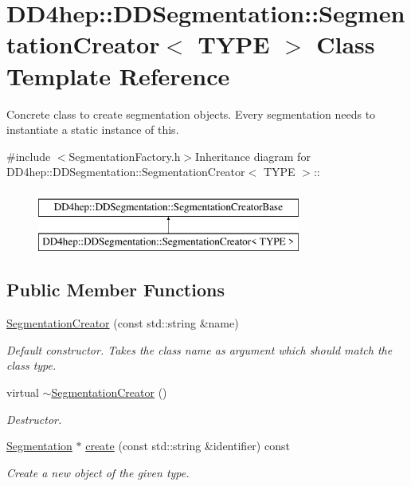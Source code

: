 \hypertarget{class_d_d4hep_1_1_d_d_segmentation_1_1_segmentation_creator}{
\section{DD4hep::DDSegmentation::SegmentationCreator$<$ TYPE $>$ Class Template Reference}
\label{class_d_d4hep_1_1_d_d_segmentation_1_1_segmentation_creator}
}


Concrete class to create segmentation objects. Every segmentation needs to instantiate a static instance of this.  


{\ttfamily \#include $<$SegmentationFactory.h$>$}Inheritance diagram for DD4hep::DDSegmentation::SegmentationCreator$<$ TYPE $>$::\begin{figure}[H]
\begin{center}
\leavevmode
\includegraphics[height=2cm]{class_d_d4hep_1_1_d_d_segmentation_1_1_segmentation_creator}
\end{center}
\end{figure}
\subsection*{Public Member Functions}
\begin{DoxyCompactItemize}
\item 
\hyperlink{class_d_d4hep_1_1_d_d_segmentation_1_1_segmentation_creator_aa260ef2741fe49696c70711f03c646cc}{SegmentationCreator} (const std::string \&name)
\begin{DoxyCompactList}\small\item\em Default constructor. Takes the class name as argument which should match the class type. \item\end{DoxyCompactList}\item 
virtual \hyperlink{class_d_d4hep_1_1_d_d_segmentation_1_1_segmentation_creator_abb405dd7c3a0092bfc072e8564dda6af}{$\sim$SegmentationCreator} ()
\begin{DoxyCompactList}\small\item\em Destructor. \item\end{DoxyCompactList}\item 
\hyperlink{class_d_d4hep_1_1_d_d_segmentation_1_1_segmentation}{Segmentation} $\ast$ \hyperlink{class_d_d4hep_1_1_d_d_segmentation_1_1_segmentation_creator_a2b9ff4869b443f3b04a017174206281b}{create} (const std::string \&identifier) const 
\begin{DoxyCompactList}\small\item\em Create a new object of the given type. \item\end{DoxyCompactList}\end{DoxyCompactItemize}


